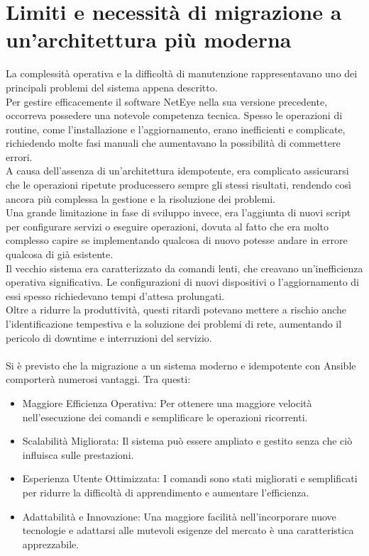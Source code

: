 \section{Limiti e necessità di migrazione a un'architettura più moderna}
\label{sec:necessita_di_migrazione} La complessità operativa e la difficoltà di manutenzione
rappresentavano uno dei principali problemi del sistema appena descritto.\\ Per gestire
efficacemente il software NetEye nella sua versione precedente, occorreva
possedere una notevole competenza tecnica. Spesso le operazioni di routine, come
l'installazione e l'aggiornamento, erano inefficienti e complicate, richiedendo
molte fasi manuali che aumentavano la possibilità di commettere errori.\\ A
causa dell'assenza di un'architettura idempotente, era complicato assicurarsi che
le operazioni ripetute producessero sempre gli stessi risultati, rendendo così
ancora più complessa la gestione e la risoluzione dei problemi.\\ Una grande
limitazione in fase di sviluppo invece, era l'aggiunta di nuovi script per configurare
servizi o eseguire operazioni, dovuta al fatto che era molto complesso capire se
implementando qualcosa di nuovo potesse andare in errore qualcosa di già
esistente.\\ Il vecchio sistema era caratterizzato da comandi lenti, che creavano
un'inefficienza operativa significativa. Le configurazioni di nuovi dispositivi
o l'aggiornamento di essi spesso richiedevano tempi d'attesa prolungati.\\ Oltre
a ridurre la produttività, questi ritardi potevano mettere a rischio anche l'identificazione
tempestiva e la soluzione dei problemi di rete, aumentando il pericolo di
downtime e interruzioni del servizio.\\ \\ Si è previsto che la migrazione a un
sistema moderno e idempotente con Ansible comporterà numerosi vantaggi. Tra questi:
\begin{itemize}
  \item Maggiore Efficienza Operativa: Per ottenere una maggiore velocità nell'esecuzione
    dei comandi e semplificare le operazioni ricorrenti.

  \item Scalabilità Migliorata: Il sistema può essere ampliato e gestito senza
    che ciò influisca sulle prestazioni.

  \item Esperienza Utente Ottimizzata: I comandi sono stati migliorati e
    semplificati per ridurre la difficoltà di apprendimento e aumentare l'efficienza.

  \item Adattabilità e Innovazione: Una maggiore facilità nell'incorporare nuove
    tecnologie e adattarsi alle mutevoli esigenze del mercato è una
    caratteristica apprezzabile.
\end{itemize}
